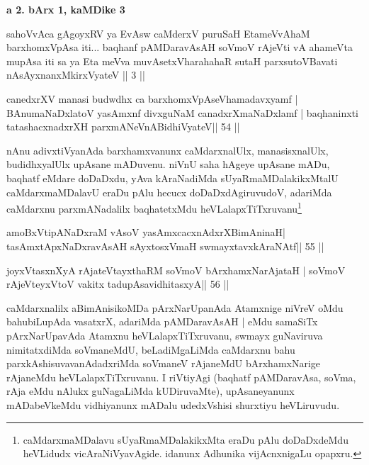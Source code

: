 \begin{center}
{\large\bf a 2. bArx 1, kaMDike 3}
\end{center}

\begin{shl}
sahoVvAca gAgoyxRV ya EvAsw caMderxV puruSaH
EtameVvAhaM barxhomxVpAsa iti...
baqhanf pAMDaravAsAH soVmoV rAjeVti
vA ahameVta mupAsa iti sa ya Eta meVva
muvAsetxV\s harahahaR sutaH parxsutoVBavati
nAsAyxnanxMkirxVyateV || 3 ||
\end{shl}


\begin{shl}
canedxrXV manasi budwdhx ca barxhomxVpAseV\s hamadavxyamf |
BAnumaNaDxlatoV yasAmxnf divxguNaM canadxrXmaNaDxlamf |
baqhaninxti tatashacxnadxrXH parxmANeVnABidhiVyateV\hfill || 54 ||
\end{shl}

\begin{artha}
nAnu adivxtiVyanAda barxhamxvanunx caMdarxnalUlx, manasisxnalUlx,  budidhxyalUlx upAsane mADuvenu. niVnU saha hAgeye upAsane mADu,  baqhatf eMdare doDaDxdu, yAva kAraNadiMda sUyaRmaMDalakikxMtalU caMdarxmaMDalavU eraDu pAlu hecucx doDaDxdAgiruvudoV, adariMda caMdarxnu parxmANadalilx baqhatetxMdu heVLalapxTiTxruvanu\footnote[8]{caMdarxmaMDalavu sUyaRmaMDalakikxMta eraDu pAlu doDaDxdeMdu heVLidudx vicAraNiVyavAgide. idanunx Adhunika vijAcnxnigaLu opapxru.}
\end{artha}

\begin{shl}
amoBxV\s tipANaDxraM vAsoV yasAmxcacxnAdxrXBimAninaH|
tasAmxtApxNaDxravAsAH sAyxtosxVmaH swmayxtavxkAraNAtf\hfill || 55 ||
\end{shl}

\begin{shl}
joyxVtasxnXyA rAjateV\s tayxthaRM soVmoV bArxhamxNarAjataH |
soVmoV rAjeVteyxVtoV vakitx tadupAsavidhitasxyA\hfill || 56 ||
\end{shl}

\begin{artha}
caMdarxnalilx aBimAnisikoMDa pArxNarUpanAda Atamxnige niVreV oMdu  bahubiLupAda vasatxrX, adariMda pAMDaravAsAH | eMdu samaSiTx  pArxNarUpavAda Atamxnu heVLalapxTiTxruvanu, swmayx guNaviruva  nimitatxdiMda soVmaneMdU, beLadiMgaLiMda caMdarxnu bahu  parxkAshisuvavanAdadxriMda soVmaneV rAjaneMdU bArxhamxNarige rAjaneMdu heVLalapxTiTxruvanu. I riVtiyAgi (baqhatf pAMDaravAsa, soVma, rAja eMdu nAlukx guNagaLiMda kUDiruvaMte), upAsaneyanunx mADabeVkeMdu vidhiyanunx mADalu udedxVshisi shurxtiyu heVLiruvudu.
\end{artha}

